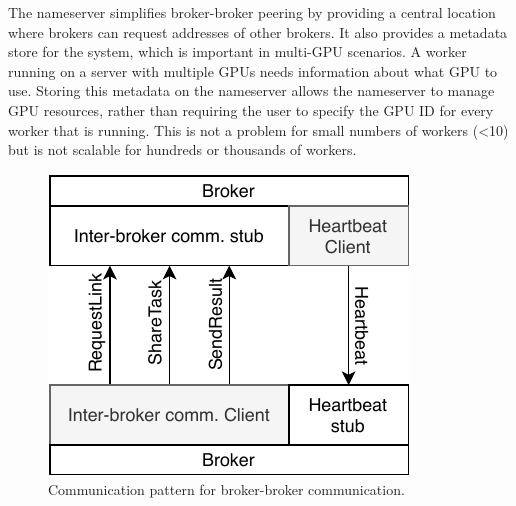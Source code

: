 \documentclass[conference]{IEEEtran}
\begin{document}
The nameserver simplifies broker-broker peering by providing a central location
where brokers can request addresses of other brokers. It also provides a metadata
store for the system, which is important in multi-GPU scenarios. A worker running
on a server with multiple GPUs needs information about what GPU to use. Storing
this metadata on the nameserver allows the nameserver to manage GPU resources,
rather than requiring the user to specify the GPU ID for every worker that is
running. This is not a problem for small numbers of workers (<10) but is not
scalable for hundreds or thousands of workers.

% 
% 
\begin{figure}
  \centering
  \includegraphics{img/broker_broker}
  \caption{Communication pattern for broker-broker communication.}
  \label{fig:broker-broker}
\end{figure}
\end{document}
